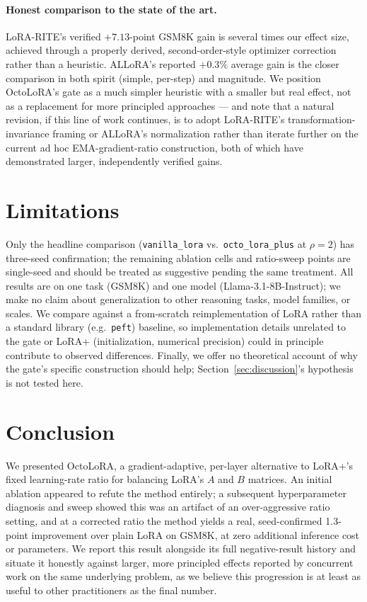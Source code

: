 \documentclass[11pt]{article}
\begin{document}
\paragraph{Honest comparison to the state of the art.} LoRA-RITE's
verified $+7.13$-point GSM8K gain \citep{lorarite2024} is several times
our effect size, achieved through a properly derived, second-order-style
optimizer correction rather than a heuristic. ALLoRA's reported $+0.3\%$
average gain \citep{allora2024} is the closer comparison in both spirit
(simple, per-step) and magnitude. We position OctoLoRA's gate as a much
simpler heuristic with a smaller but real effect, not as a replacement for
more principled approaches — and note that a natural revision, if this
line of work continues, is to adopt LoRA-RITE's transformation-invariance
framing or ALLoRA's normalization rather than iterate further on the
current ad hoc EMA-gradient-ratio construction, both of which have
demonstrated larger, independently verified gains.

\section{Limitations}

Only the headline comparison (\texttt{vanilla\_lora} vs.\
\texttt{octo\_lora\_plus} at $\rho{=}2$) has three-seed confirmation; the
remaining ablation cells and ratio-sweep points are single-seed and should
be treated as suggestive pending the same treatment. All results are on
one task (GSM8K) and one model (Llama-3.1-8B-Instruct); we make no claim
about generalization to other reasoning tasks, model families, or scales.
We compare against a from-scratch reimplementation of LoRA rather than a
standard library (e.g.\ \texttt{peft}) baseline, so implementation details
unrelated to the gate or LoRA+ (initialization, numerical precision) could
in principle contribute to observed differences. Finally, we offer no
theoretical account of why the gate's specific construction should help;
Section~\ref{sec:discussion}'s hypothesis is not tested here.

\section{Conclusion}

We presented OctoLoRA, a gradient-adaptive, per-layer alternative to
LoRA+'s fixed learning-rate ratio for balancing LoRA's $A$ and $B$
matrices. An initial ablation appeared to refute the method entirely; a
subsequent hyperparameter diagnosis and sweep showed this was an artifact
of an over-aggressive ratio setting, and at a corrected ratio the method
yields a real, seed-confirmed 1.3-point improvement over plain LoRA on
GSM8K, at zero additional inference cost or parameters. We report this
result alongside its full negative-result history and situate it honestly
against larger, more principled effects reported by concurrent work on the
same underlying problem, as we believe this progression is at least as
useful to other practitioners as the final number.
\end{document}
